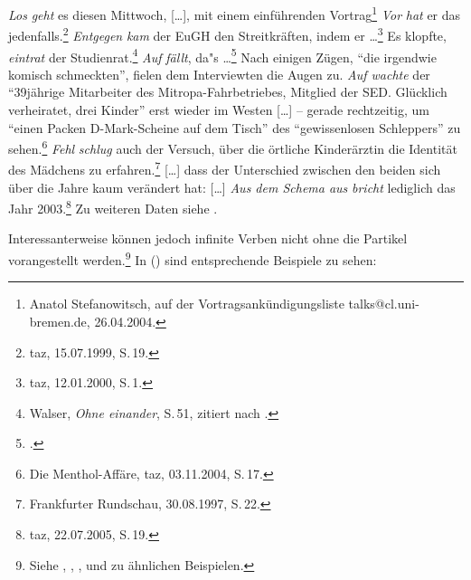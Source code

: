 \eal
\label{bsp-partikel-fronting}
\ex \emph{Los} \emph{geht} es diesen Mittwoch, [\ldots], mit einem einführenden Vortrag\footnote{
  Anatol Stefanowitsch, auf der Vortragsankündigungsliste talks@cl.uni-bremen.de, 26.04.2004.
}
\ex
\label{bsp-vor-hat-er-das}
\emph{Vor} \emph{hat} er das jedenfalls.\footnote{
taz, 15.07.1999, S.\,19.
}
\ex \emph{Entgegen} \emph{kam} der EuGH den Streitkräften, indem er \ldots{}\footnote{
taz, 12.01.2000, S.\,1.}
\ex Es klopfte, \emph{eintrat} der Studienrat.\footnote{
Walser, \emph{Ohne einander}, S.\,51, zitiert nach .
}
\ex\label{bsp-auf-faellt}
\emph{Auf}  \emph{fällt}, da"s \ldots{}\footnote{
  .
}
\ex\label{bsp-auf-wachte}
Nach einigen Zügen, "`die irgendwie komisch schmeckten"', fielen dem Interviewten die Augen zu. 
\emph{Auf wachte} der "`39jährige Mitarbeiter des Mitropa-Fahrbetriebes, Mitglied der SED. Glücklich verheiratet, drei Kinder"'
erst %
wieder im Westen [\ldots] -- gerade rechtzeitig, um "`einen Packen D-Mark-Scheine auf dem Tisch"' 
des "`gewissenlosen Schleppers"' zu sehen.\footnote{
  Die Menthol-Affäre, taz, 03.11.2004, S.\,17.
}
\ex \emph{Fehl} \emph{schlug} auch der Versuch, über die örtliche Kinderärztin die Identität des Mädchens zu erfahren.\footnote{
  Frankfurter Rundschau, 30.08.1997, S.\,22.
}
\ex\label{aus-dem-schema-aus-bricht}
{}[\ldots] dass der Unterschied zwischen den beiden sich über die Jahre kaum verändert hat: [\ldots]
    \emph{Aus dem Schema aus} \emph{bricht} lediglich das Jahr 2003.\footnote{
    taz, 22.07.2005, S.\,19.
}
\zl
Zu weiteren Daten siehe .
\largerpage[-3]

Interessanterweise können jedoch infinite Verben nicht ohne die Partikel vorangestellt werden.\footnote{
        Siehe , , , %
         und  zu ähnlichen Beispielen.
}
In () sind entsprechende Beispiele zu sehen:
\pagebreak
\eal
\label{ex-fronting-part-stranded}
\zl

